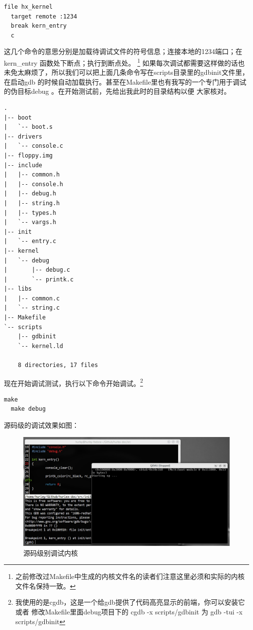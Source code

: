 \begin{Verbatim}[frame=single]
  file hx_kernel
  target remote :1234
  break kern_entry
  c
\end{Verbatim}

\par 这几个命令的意思分别是加载待调试文件的符号信息；连接本地的1234端口；在 kern\_entry 函数处下断点；执行到断点处。\allowbreak
\footnote{之前修改过Makefile中生成的内核文件名的读者们注意这里必须和实际的内核文件名保持一致。}\allowbreak
如果每次调试都需要这样做的话也未免太麻烦了，所以我们可以把上面几条命令写在scripts目录里的gdbinit文件里，在启动gdb\allowbreak
的时候自动加载执行。甚至在Makefile里也有我写的一个专门用于调试的伪目标debug 。在开始测试前，先给出我此时的目录结构以便\allowbreak
大家核对。

\begin{Verbatim}[frame=single]
.
|-- boot
|   `-- boot.s
|-- drivers
|   `-- console.c
|-- floppy.img
|-- include
|   |-- common.h
|   |-- console.h
|   |-- debug.h
|   |-- string.h
|   |-- types.h
|   `-- vargs.h
|-- init
|   `-- entry.c
|-- kernel
|   `-- debug
|       |-- debug.c
|       `-- printk.c
|-- libs
|   |-- common.c
|   `-- string.c
|-- Makefile
`-- scripts
    |-- gdbinit
    `-- kernel.ld
    
    8 directories, 17 files
\end{Verbatim}

\par 现在开始调试测试，执行以下命令开始调试。\footnote{我使用的是cgdb，这是一个给gdb提供了代码高亮显示的前端，你可以安装它或者\allowbreak
修改Makefile里面debug项目下的 cgdb -x scripts/gdbinit 为 gdb -tui -x scripts/gdbinit}

\begin{Verbatim}[frame=single]
  make
  make debug
\end{Verbatim}

\par 源码级的调试效果如图：

\begin{figure}[H]
      \centering
      \includegraphics[scale=0.4]{picture/chapt5/os_debug.png}
      \caption{源码级别调试内核}
\end{figure}

